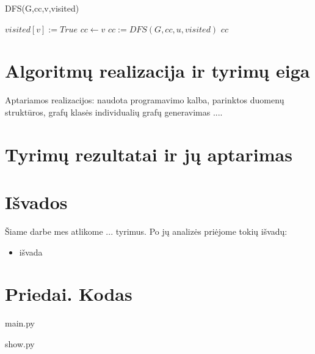 \documentclass[bibliography=totoc]{article}
\begin{document}
\begin{algorithm}[h]\citep{GTWA}
    \caption{DFS(G,cc,v,visited)}
    \begin{algorithmic}[1]
        \STATE $visited[v] := True$
        \STATE $cc\leftarrow v$
                \STATE $cc := DFS(G,cc,u,visited)$
            \ENDIF
        \ENDFOR
        \RETURN $cc$
    \end{algorithmic}
\end{algorithm}    
\clearpage
\newpage
\section{Algoritmų realizacija ir tyrimų eiga}
Aptariamos realizacijos: naudota programavimo kalba, parinktos duomenų struktūros,
grafų klasės individualių grafų generavimas ....

\section{Tyrimų rezultatai ir jų aptarimas}
\newpage 
\section*{Išvados}
\label{sec:isvados}
Šiame darbe mes atlikome ... tyrimus. Po jų analizės priėjome tokių išvadų:

\begin{itemize}
\item išvada
\end{itemize}

\newpage 


\newpage 
\appendix
\section*{Priedai. Kodas}
\label{sec:priedas}
 
\lstset{style=mystyle}
main.py

show.py

\end{document}

